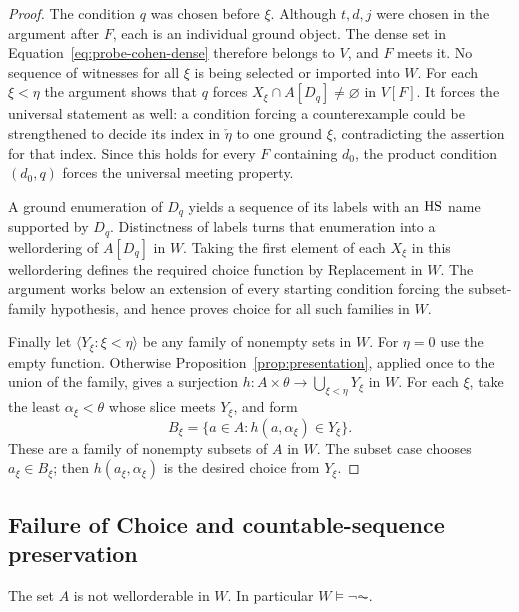 \begin{proof}
The condition \(q\) was chosen before \(\xi\).
Although \(t,d,j\) were chosen in the argument after \(F\),
each is an individual ground object.
The dense set in Equation~\eqref{eq:probe-cohen-dense} therefore
belongs to \(V\), and \(F\) meets it.
No sequence of witnesses for all \(\xi\) is being selected or
imported into \(W\).
For each \(\xi<\eta\) the argument shows that \(q\) forces
\(X_\xi\cap A[D_q]\neq\varnothing\) in \(V[F]\).
It forces the universal statement as well: a condition forcing
a counterexample could be strengthened to decide its index in
\(\check\eta\) to one ground \(\xi\), contradicting the
assertion for that index.
Since this holds for every \(F\) containing \(d_0\), the product
condition \((d_0,q)\) forces the universal meeting property.

A ground enumeration of \(D_q\) yields a sequence of its labels
with an \(\mathrm{HS}\) name supported by \(D_q\).
Distinctness of labels turns that enumeration into a wellordering
of \(A[D_q]\) in \(W\).
Taking the first element of each \(X_\xi\) in this wellordering
defines the required choice function by Replacement in \(W\).
The argument works below an extension of every starting
condition forcing the subset-family hypothesis, and hence proves
choice for all such families in \(W\).

Finally let \(\langle Y_\xi:\xi<\eta\rangle\) be any family
of nonempty sets in \(W\).
For \(\eta=0\) use the empty function.
Otherwise Proposition~\ref{prop:presentation}, applied once to
the union of the family, gives a surjection
\(h:A\times\theta\to\bigcup_{\xi<\eta}Y_\xi\) in \(W\).
For each \(\xi\), take the least \(\alpha_\xi<\theta\)
whose slice meets \(Y_\xi\), and form
\[
 B_\xi=\{a\in A:h(a,\alpha_\xi)\in Y_\xi\}.
\]
These are a family of nonempty subsets of \(A\) in \(W\).
The subset case chooses \(a_\xi\in B_\xi\);
then \(h(a_\xi,\alpha_\xi)\) is the desired choice from \(Y_\xi\).
\end{proof}

\subsection{Failure of Choice and countable-sequence preservation}

\begin{proposition}\label{prop:not-choice}
The set \(A\) is not wellorderable in \(W\).
In particular \(W\models\neg\AC\).
\end{proposition}

